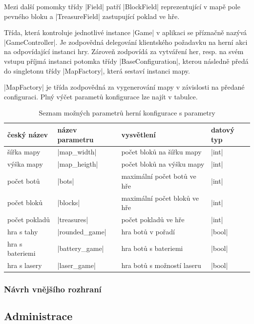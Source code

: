 Mezi další pomomky třídy \ic|Field| patří \ic|BlockField| reprezentující v mapě pole pevného bloku a \ic|TreasureField| zastupující poklad ve hře.

Třída, která kontroluje jednotlivé instance \ic|Game| v aplikaci se příznačně nazývá \ic|GameController|. Je zodpovědná delegování klientského požadavku na herní akci na odpovídající instanci hry. Zároveň zodpovídá za vytváření her, resp. na svém vstupu příjmá instanci potomka třídy \ic|BaseConfiguration|, kterou následně předá do singletonu třídy \ic|MapFactory|, která sestaví instanci mapy.

\ic|MapFactory| je třída zodpovědná za vygenerování mapy v závislosti na předané configuraci. Plný výčet parametů konfigurace lze najít v tabulce.

\begin{table}[H]
	\caption{Seznam možných parametrů herní konfigurace s parametry}
	\label{table:conf-parameters}
	\centering
	\begin{tabular}{ l | l | l | l }
		český název & název parametru & vysvětlení & datový typ \\
		\hline
		šířka mapy & \ic|map_width| & počet bloků na šířku mapy & \ic|int| \\
		výška mapy & \ic|map_heigth| & počet bloků na výšku mapy & \ic|int| \\
		počet botů & \ic|bots| & maximální počet botů ve hře & \ic|int| \\
		počet bloků & \ic|blocks| & maximální počet bloků ve hře & \ic|int| \\
		počet pokladů & \ic|treasures| & počet pokladů ve hře & \ic|int| \\
		hra s tahy & \ic|rounded_game| & hra botů v pořadí & \ic|bool| \\
		hra s bateriemi & \ic|battery_game| & hra botů s bateriemi & \ic|bool| \\
		hra s lasery & \ic|laser_game| & hra botů s možností laseru & \ic|bool| \\
	\end{tabular}
\end{table}

\subsubsection{Návrh vnějšího rozhraní}


\subsection{Administrace}

